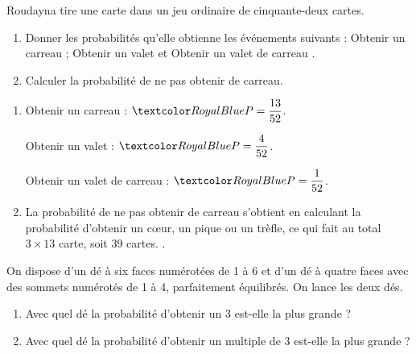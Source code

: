 \begin{Maquette}[Fiche,CorrigeFin,Colonnes=2]{}
\begin{multicols}{2}
       
      \begin{exercice} %
         Roudayna tire une carte dans un jeu ordinaire de cinquante-deux cartes.
         \begin{enumerate}
            \item Donner les probabilités qu'elle obtienne les événements suivants : \og Obtenir un carreau \fg ; \og Obtenir un valet \fg{} et \og Obtenir un valet de carreau \fg.
            \item Calculer la probabilité de ne pas obtenir de carreau.
         \end{enumerate}
      \end{exercice}
      
      \begin{Solution}
         \begin{enumerate}
            \item Obtenir un carreau : $\cor{P =\dfrac{13}{52}}$. \par
               Obtenir un valet : $\cor{P =\dfrac{4}{52}}$. \par
               Obtenir un valet de carreau  : $\cor{P =\dfrac{1}{52}}$. \smallskip
            \item La probabilité de ne pas obtenir de carreau s'obtient en calculant la probabilité d'obtenir un c\oe ur, un pique ou un trèfle, ce qui fait au total $3\times13$ carte, soit 39 cartes. .
         \end{enumerate}      
      \end{Solution}
      
      
      \begin{exercice} %
         On dispose d’un dé à six faces numérotées de 1 à 6 et d’un dé à quatre faces avec des sommets numérotés de 1 à 4, parfaitement équilibrés. On lance les deux dés.
         \begin{enumerate}
            \item Avec quel dé la probabilité d’obtenir un 3 est-elle la plus grande ?
            \item Avec quel dé la probabilité d’obtenir un multiple de 3 est-elle la plus grande ?
         \end{enumerate}
      \end{exercice}
      

\end{multicols}
\end{Maquette}
